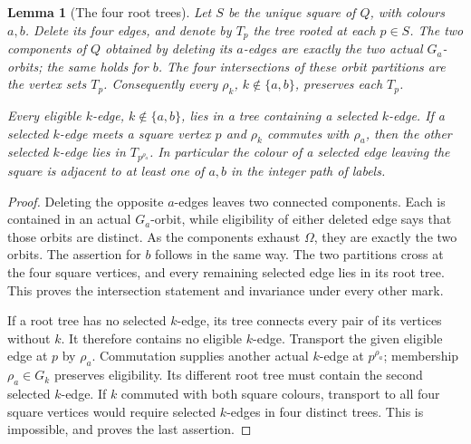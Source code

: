 \documentclass[11pt,a4paper]{article}
\newtheorem{lemma}[theorem]{Lemma}
\begin{document}
\begin{lemma}[The four root trees]\label{trees}
Let $S$ be the unique square of $Q$, with colours $a,b$. Delete its
four edges, and denote by $T_p$ the tree rooted at each $p\in S$.
The two components of $Q$ obtained by deleting its $a$-edges are
exactly the two actual $G_a$-orbits; the same holds for $b$.
The four intersections of these orbit partitions are the vertex
sets $T_p$. Consequently every $\rho_k$, $k\notin\{a,b\}$,
preserves each $T_p$.

Every eligible $k$-edge, $k\notin\{a,b\}$, lies in a tree containing
a selected $k$-edge. If a selected $k$-edge meets a square vertex
$p$ and $\rho_k$ commutes with $\rho_a$, then the other selected
$k$-edge lies in $T_{p^{\rho_a}}$. In particular the colour of a
selected edge leaving the square is adjacent to at least one of
$a,b$ in the integer path of labels.
\end{lemma}
\begin{proof}
Deleting the opposite $a$-edges leaves two connected components.
Each is contained in an actual $G_a$-orbit, while eligibility of
either deleted edge says that those orbits are distinct. As the
components exhaust $\Omega$, they are exactly the two orbits.
The assertion for $b$ follows in the same way. The two partitions
cross at the four square vertices, and every remaining selected edge
lies in its root tree. This proves the intersection statement and
invariance under every other mark.

If a root tree has no selected $k$-edge, its tree connects every
pair of its vertices without $k$. It therefore contains no eligible
$k$-edge. Transport the given eligible edge at $p$ by $\rho_a$.
Commutation supplies another actual $k$-edge at $p^{\rho_a}$;
membership $\rho_a\in G_k$ preserves eligibility. Its different
root tree must contain the second selected $k$-edge. If $k$
commuted with both square colours, transport to all four square
vertices would require selected $k$-edges in four distinct trees.
This is impossible, and proves the last assertion.
\end{proof}
\end{document}
